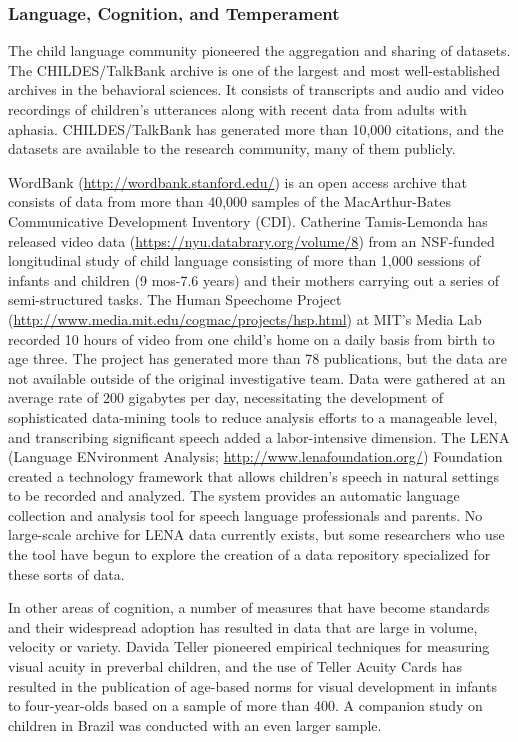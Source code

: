 \documentclass[letterpaper,man,apacite,natbib]{apa6}
\begin{document}
\subsubsection{Language, Cognition, and Temperament}

The child language community pioneered the aggregation and sharing of datasets.
The CHILDES/TalkBank \cite{macwhinney_childes_2001} archive is one of the largest and most well-established archives in the behavioral sciences.
It consists of transcripts and audio and video recordings of children's utterances along with recent data from adults with aphasia.
CHILDES/TalkBank has generated more than 10,000 citations, and the datasets are available to the research community, many of them publicly.

WordBank (\url{http://wordbank.stanford.edu/}) is an open access archive that consists of data from more than 40,000 samples of the MacArthur-Bates Communicative Development Inventory (CDI).
Catherine Tamis-Lemonda has released video data (\url{https://nyu.databrary.org/volume/8}) from an NSF-funded longitudinal study of child language consisting of more than 1,000 sessions of infants and children (9 mos-7.6 years) and their mothers carrying out a series of semi-structured tasks.
The Human Speechome Project (\url{http://www.media.mit.edu/cogmac/projects/hsp.html}) at MIT's Media Lab recorded 10 hours of video from one child's home on a daily basis from birth to age three.
The project has generated more than 78 publications, but the data are not available outside of the original investigative team.
Data were gathered at an average rate of 200 gigabytes per day, necessitating the development of sophisticated data-mining tools to reduce analysis efforts to a manageable level, and transcribing significant speech added a labor-intensive dimension.
The LENA (Language ENvironment Analysis; \url{http://www.lenafoundation.org/}) Foundation created a technology framework that allows children's speech in natural settings to be recorded and analyzed.
The system provides an automatic language collection and analysis tool for speech language professionals and parents.
No large-scale archive for LENA data currently exists, but some researchers who use the tool have begun to explore the creation of a data repository specialized for these sorts of data.

In other areas of cognition, a number of measures that have become standards and their widespread adoption has resulted in data that are large in volume, velocity or variety.
Davida Teller \cite{teller1986assessment} pioneered empirical techniques for measuring visual acuity in preverbal children, and the use of Teller Acuity Cards has resulted in the publication of age-based norms for visual development in infants to four-year-olds \cite{mayer_monocular_1995} based on a sample of more than 400.
A companion study on children in Brazil \cite{salomao_large_1995} was conducted with an even larger sample.
\end{document}
